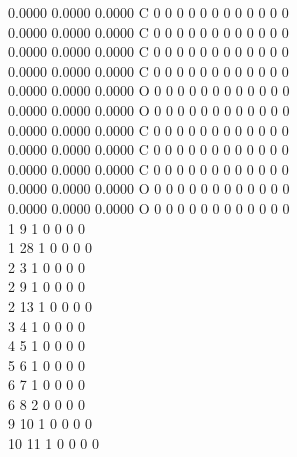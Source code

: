 \documentclass[11pt,titlepage,dvipdfmx,twoside]{article}
\begin{document}
\begin{oframed}
{    0.0000    0.0000    0.0000  C  0  0  0  0  0  0  0  0  0  0  0  0      \\
    0.0000    0.0000    0.0000  C  0  0  0  0  0  0  0  0  0  0  0  0      \\
    0.0000    0.0000    0.0000  C  0  0  0  0  0  0  0  0  0  0  0  0      \\
    0.0000    0.0000    0.0000  C  0  0  0  0  0  0  0  0  0  0  0  0      \\
    0.0000    0.0000    0.0000  O  0  0  0  0  0  0  0  0  0  0  0  0      \\
    0.0000    0.0000    0.0000  O  0  0  0  0  0  0  0  0  0  0  0  0      \\
    0.0000    0.0000    0.0000  C  0  0  0  0  0  0  0  0  0  0  0  0      \\
    0.0000    0.0000    0.0000  C  0  0  0  0  0  0  0  0  0  0  0  0      \\
    0.0000    0.0000    0.0000  C  0  0  0  0  0  0  0  0  0  0  0  0      \\
    0.0000    0.0000    0.0000  O  0  0  0  0  0  0  0  0  0  0  0  0      \\
    0.0000    0.0000    0.0000  O  0  0  0  0  0  0  0  0  0  0  0  0      \\
  1  9  1  0  0  0  0                                                      \\
  1 28  1  0  0  0  0                                                      \\
  2  3  1  0  0  0  0                                                      \\
  2  9  1  0  0  0  0                                                      \\
  2 13  1  0  0  0  0                                                      \\
  3  4  1  0  0  0  0                                                      \\
  4  5  1  0  0  0  0                                                      \\
  5  6  1  0  0  0  0                                                      \\
  6  7  1  0  0  0  0                                                      \\
  6  8  2  0  0  0  0                                                      \\
  9 10  1  0  0  0  0                                                      \\
 10 11  1  0  0  0  0                                                      \\
}
\end{oframed}
\end{document}
